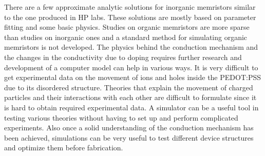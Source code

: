 \begin{doublespace}
There are a few approximate analytic solutions for inorganic memristors similar to the one produced in HP labs. These solutions are mostly based on parameter fitting and some basic physics. Studies on organic memristors are more sparse than studies on inorganic ones and a standard method for simulating organic memristors is not developed. The physics behind the conduction mechanism and the changes in the conductivity due to doping requires further research and development of a computer model can help in various ways. It is very difficult to get experimental data on the movement of ions and holes inside the PEDOT:PSS due to its disordered structure. Theories that explain the movement of charged particles and their interactions with each other are difficult to formulate since it is hard to obtain required experimental data. A simulator can be a useful tool in testing various theories without having to set up and perform complicated experiments. Also once a solid understanding of the conduction mechanism has been achieved, simulations can be very useful to test different device structures and optimize them before fabrication. 


 \end{doublespace}